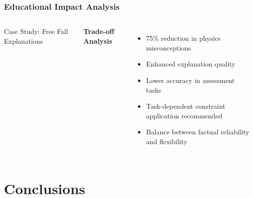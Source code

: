 \documentclass{beamer}
\begin{document}
\begin{frame}
\frametitle{Educational Impact Analysis}

\begin{columns}

\begin{block}{Case Study: Free Fall Explanations}
\begin{center}
\end{center}
\end{block}

\textbf{Trade-off Analysis}
\begin{itemize}
    \item 75\% reduction in physics misconceptions
    \item Enhanced explanation quality
    \item Lower accuracy in assessment tasks
    \item Task-dependent constraint application recommended
    \item Balance between factual reliability and flexibility
\end{itemize}

\end{columns}
\end{frame}

\section{Conclusions}
\end{document}
